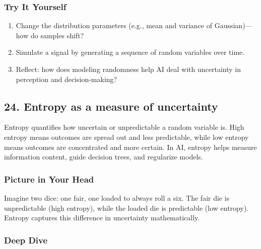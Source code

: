 \documentclass[
  letterpaper,
  DIV=11,
  numbers=noendperiod]{scrreprt}
\providecommand{\tightlist}{%
  \setlength{\itemsep}{0pt}\setlength{\parskip}{0pt}}
\begin{document}
\subsubsection{Try It Yourself}\label{try-it-yourself-22}

\begin{enumerate}
\def\labelenumi{\arabic{enumi}.}
\tightlist
\item
  Change the distribution parameters (e.g., mean and variance of
  Gaussian)---how do samples shift?
\item
  Simulate a signal by generating a sequence of random variables over
  time.
\item
  Reflect: how does modeling randomness help AI deal with uncertainty in
  perception and decision-making?
\end{enumerate}

\subsection{24. Entropy as a measure of
uncertainty}\label{entropy-as-a-measure-of-uncertainty}

Entropy quantifies how uncertain or unpredictable a random variable is.
High entropy means outcomes are spread out and less predictable, while
low entropy means outcomes are concentrated and more certain. In AI,
entropy helps measure information content, guide decision trees, and
regularize models.

\subsubsection{Picture in Your Head}\label{picture-in-your-head-23}

Imagine two dice: one fair, one loaded to always roll a six. The fair
die is unpredictable (high entropy), while the loaded die is predictable
(low entropy). Entropy captures this difference in uncertainty
mathematically.

\subsubsection{Deep Dive}\label{deep-dive-23}
\end{document}
